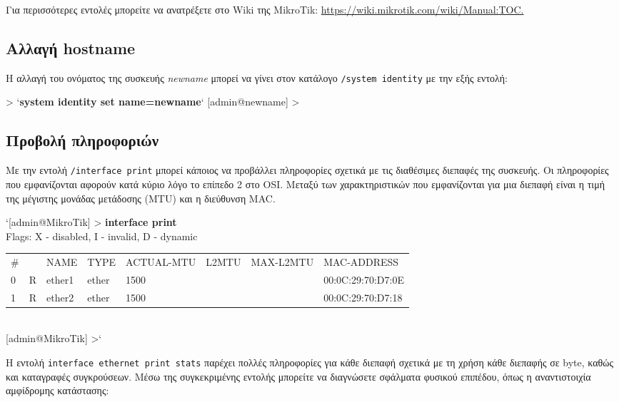 \documentclass{EdipyLabs} %
\begin{document}
Για περισσότερες εντολές μπορείτε να ανατρέξετε στο Wiki της MikroTik: \url{https://wiki.mikrotik.com/wiki/Manual:TOC.}

\subsection{Αλλαγή hostname}

H αλλαγή του ονόματος της συσκευής \textit{newname} μπορεί να γίνει στον κατάλογο \texttt{/system identity} με την εξής εντολή:

\begin{CommandBox}
 > `\textbf{system identity set name=newname}`
[admin@newname] > 
\end{CommandBox}

\subsection{Προβολή πληροφοριών}

Με την εντολή \texttt{/interface print} μπορεί κάποιος να προβάλλει πληροφορίες σχετικά με τις διαθέσιμες διεπαφές της συσκευής. Οι πληροφορίες που εμφανίζονται αφορούν κατά κύριο λόγο το επίπεδο 2 στο OSI. Μεταξύ των χαρακτηριστικών που εμφανίζονται για μια διεπαφή είναι η τιμή της μέγιστης μονάδας μετάδοσης (MTU) και η διεύθυνση MAC.

\begin{CommandBox}
`{[admin@MikroTik]} > \textbf{interface print}\\                                   
	Flags: X - disabled, I - invalid, D - dynamic\\ 
\begin{tabular}{@{}llllllll}
	\# &   &NAME                 &TYPE             &ACTUAL-MTU &L2MTU &MAX-L2MTU &MAC-ADDRESS\\
	0  &R &ether1               &ether            &1500 &&&00:0C:29:70:D7:0E\\
	1  &R &ether2               &ether            &1500 &&&00:0C:29:70:D7:18
\end{tabular}\\[0.125cm]                               
{[admin@MikroTik]} >`
\end{CommandBox}

Η εντολή \texttt{interface ethernet print stats} παρέχει πολλές πληροφορίες για κάθε διεπαφή σχετικά με τη χρήση κάθε διεπαφής σε byte, καθώς και καταγραφές συγκρούσεων. Μέσω της συγκεκριμένης εντολής μπορείτε να διαγνώσετε σφάλματα φυσικού επιπέδου, όπως η αναντιστοιχία αμφίδρομης κατάστασης:
\end{document}
